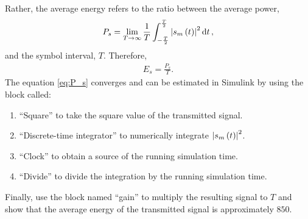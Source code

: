 \documentclass[12pt,a4paper]{article}
\begin{document}
Rather, the average energy refers to the ratio between the average power,
\begin{align}
    \label{eq:P_s}
    P_s = \lim_{T \rightarrow \infty} \frac{1}{T} \int_{-\frac{T}{2}}^{\frac{T}{2}} \abs{s_m \left( t \right)}^{2} \dd{t},
\end{align}
and the symbol interval, \(T\). Therefore,
\begin{align}
    E_s = \frac{P_s}{T}.
\end{align}
The equation \eqref{eq:P_s} converges and can be estimated in Simulink by using the block called:
\begin{enumerate}
    \item ``Square'' to take the square value of the transmitted signal.
    \item ``Discrete-time integrator'' to numerically integrate \(\abs{s_m \left( t \right)}^{2}\).
    \item ``Clock'' to obtain a source of the running simulation time.
    \item ``Divide'' to divide the integration by the running simulation time.
\end{enumerate}

Finally, use the block named ``gain'' to multiply the resulting signal to \(T\) and show that the average energy of the transmitted signal is approximately \(850\).

\printbibliography
\end{document}
